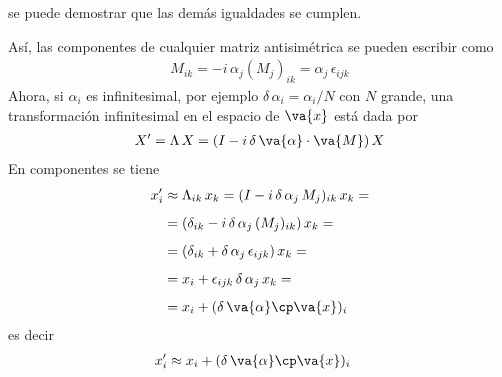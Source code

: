 se puede demostrar que las demás igualdades se cumplen.
\par
Así, las componentes de cualquier matriz antisimétrica se pueden escribir como
\begin{align}
M_{ik} = - i \, \alpha_{j} (M_{j})_{ik} = \alpha_{j} \, \epsilon_{ijk}
\label{eq:ecuacion_10_092}
\end{align}
Ahora, si $\alpha_{i}$ es infinitesimal, por ejemplo $\delta \, \alpha_{i} = \alpha_{i} / N$ con $N$ grande, una transformación infinitesimal en el espacio de $\va{x}$ está dada por
\begin{align}
X^{\prime} = \Lambda \, X = (I - i \, \delta \, \va{\alpha} \cdot \va{M}) \, X
\label{eq:ecuacion_10_093}
\end{align}
En componentes se tiene
\begin{align}
x_{i}^{\prime} &\approx \Lambda_{ik} \, x_{k} = (I - i \, \delta \, \alpha_{j} \, M_{j})_{ik} \, x_{k} = \nonumber \\[0.5em]
&= (\delta_{ik} - i \, \delta \, \alpha_{j} \, (M_{j})_{ik}) \, x_{k} = \nonumber \\[0.5em]
&= (\delta_{ik} + \delta \, \alpha_{j} \, \epsilon_{ijk}) \, x_{k} = \nonumber \\[0.5em]
&= x_{i} + \epsilon_{ijk} \, \delta \, \alpha_{j} \, x_{k} = \nonumber \\[0.5em]
&= x_{i} + (\delta \, \va{\alpha} \cp \va{x})_{i}
\label{eq:ecuacion_10_094}
\end{align}
es decir
\begin{align}
x_{i}^{\prime} &\approx x_{i} + (\delta \, \va{\alpha} \cp \va{x})_{i} \label{eq:ecuacion_10_095}
\end{align}
